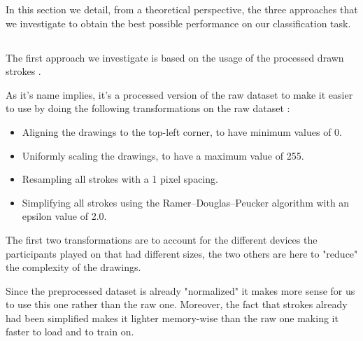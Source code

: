 \documentclass[10pt,twocolumn,letterpaper]{article}
\begin{document}
In this section we detail, from a theoretical perspective, the three approaches that we investigate to obtain the best possible performance on our classification task.

\subsection{\rnnTitle{}}

The first approach we investigate is based on the usage of the processed drawn strokes \cite{GoogleQuickdraw}.

As it's name implies, it's a processed version of the raw dataset to make it easier to use by doing the following transformations on the raw dataset \cite{GoogleQuickdraw}:

\begin{itemize}
    \item Aligning the drawings to the top-left corner, to have minimum values of 0.
    \item Uniformly scaling the drawings, to have a maximum value of 255.
    \item Resampling all strokes with a 1 pixel spacing.
    \item Simplifying all strokes using the Ramer–Douglas–Peucker \cite{wiki:rdp_algo} algorithm with an epsilon value of 2.0.
\end{itemize}

The first two transformations are to account for the different devices the participants played on that had different sizes, the two others are here to "reduce" the complexity of the drawings.

Since the preprocessed dataset is already "normalized" it makes more sense for us to use this one rather than the raw one. Moreover, the fact that strokes already had been simplified makes it lighter memory-wise than the raw one making it faster to load and to train on.
\end{document}
